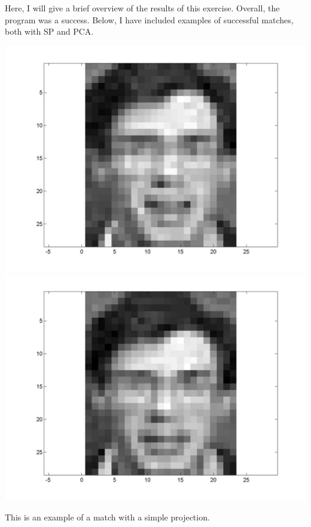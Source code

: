 \documentclass[11pt]{article} %
\begin{document}
Here, I will give a brief overview of the results of this exercise. Overall, the program was a success. Below, I have included examples of successful matches, both with SP and PCA.

\includegraphics[scale=.17]{figure2}
\includegraphics[scale=.17]{figure3}

This is an example of a match with a simple projection.
\end{document}
